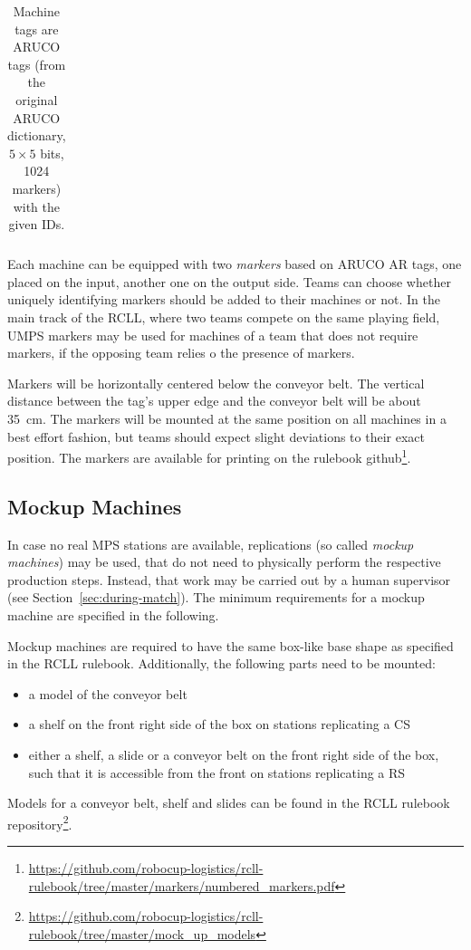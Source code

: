 \documentclass[12pt,twoside]{article}
\newcommand{\refsec}[1]{Section~\ref{#1}}
\begin{document}
\begin{table}[b!]
\begin{tabular}{|c|c|c|}
  \end{tabular}
  \caption{Machine tags are ARUCO tags (from the original ARUCO dictionary,
  $5\times 5$ bits, 1024 markers) with the given IDs.}
  \label{tab:markers}
\end{table}
Each machine can be equipped with two \emph{markers} based on ARUCO AR tags,
one placed on the input, another one on the output side.
Teams can choose whether uniquely identifying markers should be added to their
machines or not.
In the main track of the \ac{RCLL}, where two teams compete on the same playing
field, \acl{UMPS} markers may be used for machines of a team that
does not require markers, if the opposing team relies o the presence of markers.

Markers will be
horizontally centered below the conveyor belt. The vertical distance
between the tag's upper edge and the conveyor belt will be about
\SI{35}{\centi\metre}. The markers will be mounted at the same
position on all machines in a best effort fashion, but teams should expect
slight deviations to their exact position.
The markers are available for printing on the rulebook github\footnote{
  \url{https://github.com/robocup-logistics/rcll-rulebook/tree/master/markers/numbered_markers.pdf} %
}.

\subsection{Mockup Machines}
\label{sec:mockup-machines}
In case no real \ac{MPS} stations are available, replications
(so called \emph{mockup machines}) may be used, that do not need to
physically perform the respective production steps. Instead, that work may
be carried out by a human supervisor (see \refsec{sec:during-match}).
The minimum requirements for a mockup machine are specified in the following.

Mockup machines are required to have the same box-like base shape as specified
in the \ac{RCLL} rulebook.
Additionally, the following parts need to be mounted:
\begin{itemize}
	\item a model of the conveyor belt
	\item a shelf on the front right side of the box on stations replicating a
		CS
	\item either a shelf, a slide or a conveyor belt on the front right side
of the box, such that it is accessible from the front on stations replicating a
		\ac{RS}
\end{itemize}
Models for a conveyor belt, shelf and slides can be found in the
\ac{RCLL} rulebook repository\footnote{\url{https://github.com/robocup-logistics/rcll-rulebook/tree/master/mock_up_models}}. %
\end{document}
